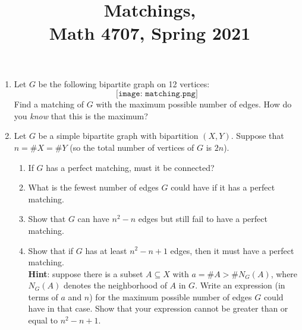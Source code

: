 \documentclass[11pt]{article}
\title{Matchings, \\ Math 4707, Spring 2021}
\date{}
\begin{document}
\maketitle

\thispagestyle{empty}

\begin{enumerate}
\item Let $G$ be the following bipartite graph on 12 vertices:
\[\texttt{[image: matching.png]}\]
Find a matching of $G$ with the maximum possible number of edges. How do you \emph{know} that this is the maximum?
\item Let $G$ be a simple bipartite graph with bipartition $(X,Y)$. Suppose that $n=\#X=\#Y$ (so the total number of vertices of $G$ is $2n$).
\begin{enumerate}
\item If $G$ has a perfect matching, must it be connected?
\item What is the fewest number of edges $G$ could have if it has a perfect matching.
\item Show that $G$ can have $n^2-n$ edges but still fail to have a perfect matching.
\item Show that if $G$ has at least $n^2-n+1$ edges, then it must have a perfect matching. \\
{\bf Hint}: suppose there is a subset $A\subseteq X$ with $a = \#A > \#N_G(A)$, where $N_G(A)$ denotes the neighborhood of $A$ in $G$. Write an expression (in terms of $a$ and $n$) for the maximum possible number of edges $G$ could have in that case. Show that your expression cannot be greater than or equal to $n^2-n+1$.
\end{enumerate}
\end{enumerate}
\end{document}
